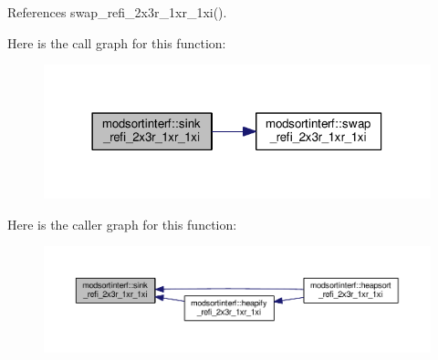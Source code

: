References swap\-\_\-refi\-\_\-2x3r\-\_\-1xr\-\_\-1xi().



Here is the call graph for this function\-:\nopagebreak
\begin{figure}[H]
\begin{center}
\leavevmode
\includegraphics[width=318pt]{classmodsortinterf_aea41780f5ae8674251a6fae90de5353b_cgraph}
\end{center}
\end{figure}




Here is the caller graph for this function\-:\nopagebreak
\begin{figure}[H]
\begin{center}
\leavevmode
\includegraphics[width=350pt]{classmodsortinterf_aea41780f5ae8674251a6fae90de5353b_icgraph}
\end{center}
\end{figure}


